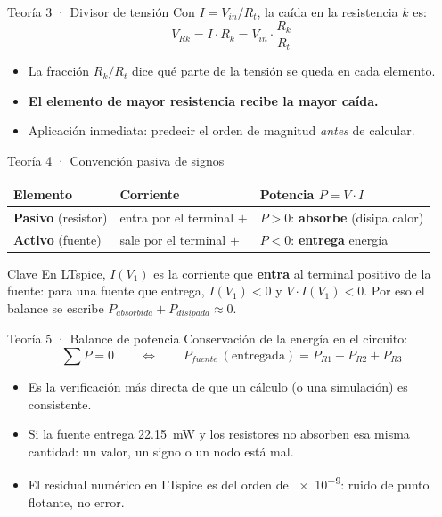\documentclass[aspectratio=169]{beamer}
\begin{document}
\begin{frame}{Teoría 3 · Divisor de tensión}
  Con $I = V_{in}/R_t$, la caída en la resistencia $k$ es:
  \[
    V_{Rk} = I\cdot R_k = V_{in}\cdot\frac{R_k}{R_t}
  \]
  \pause
  \begin{itemize}
    \item La fracción $R_k/R_t$ dice qué parte de la tensión se queda en cada elemento.
    \item \textbf{El elemento de mayor resistencia recibe la mayor caída.}
    \item Aplicación inmediata: predecir el orden de magnitud \emph{antes} de calcular.
  \end{itemize}
\end{frame}

\begin{frame}{Teoría 4 · Convención pasiva de signos}
  \begin{table}
    \begin{tabular}{lll}
      \toprule
      Elemento & Corriente & Potencia $P = V\cdot I$ \\
      \midrule
      \textbf{Pasivo} (resistor) & entra por el terminal $+$ & $P > 0$: \textbf{absorbe} (disipa calor) \\
      \textbf{Activo} (fuente)   & sale por el terminal $+$ & $P < 0$: \textbf{entrega} energía \\
      \bottomrule
    \end{tabular}
  \end{table}
  \pause
  \begin{alertblock}{Clave}
    En LTspice, $I(V_1)$ es la corriente que \textbf{entra} al terminal positivo
    de la fuente: para una fuente que entrega, $I(V_1) < 0$ y $V\cdot I(V_1) < 0$.
    Por eso el balance se escribe $P_{absorbida} + P_{disipada} \approx 0$.
  \end{alertblock}
\end{frame}

\begin{frame}{Teoría 5 · Balance de potencia}
  Conservación de la energía en el circuito:
  \[
    \boxed{\;\sum P = 0 \qquad\Longleftrightarrow\qquad
      P_{fuente}\ (\text{entregada}) = P_{R1} + P_{R2} + P_{R3}\;}
  \]
  \pause
  \begin{itemize}
    \item Es la verificación más directa de que un cálculo (o una simulación) es consistente.
    \item Si la fuente entrega \SI{22.15}{\milli\watt} y los resistores no absorben esa misma cantidad: un valor, un signo o un nodo está mal.
    \item El residual numérico en LTspice es del orden de \num{e-9}: ruido de punto flotante, no error.
  \end{itemize}
\end{frame}
\end{document}
